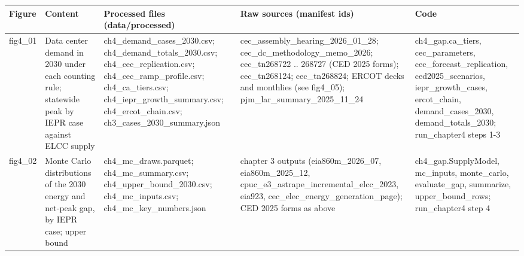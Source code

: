 \begin{tabular}{lp{4.6cm}p{5.2cm}p{4.6cm}p{4.8cm}}
\toprule
Figure & Content & Processed files (data/processed) & Raw sources (manifest ids) & Code \\
\midrule
fig4\_\allowbreak{}01 & Data center demand in 2030 under each counting rule; statewide peak by IEPR case against ELCC supply & ch4\_\allowbreak{}demand\_\allowbreak{}cases\_\allowbreak{}2030.csv; ch4\_\allowbreak{}demand\_\allowbreak{}totals\_\allowbreak{}2030.csv; ch4\_\allowbreak{}cec\_\allowbreak{}replication.csv; ch4\_\allowbreak{}cec\_\allowbreak{}ramp\_\allowbreak{}profile.csv; ch4\_\allowbreak{}ca\_\allowbreak{}tiers.csv; ch4\_\allowbreak{}iepr\_\allowbreak{}growth\_\allowbreak{}summary.csv; ch4\_\allowbreak{}ercot\_\allowbreak{}chain.csv; ch3\_\allowbreak{}cases\_\allowbreak{}2030\_\allowbreak{}summary.json & cec\_\allowbreak{}assembly\_\allowbreak{}hearing\_\allowbreak{}2026\_\allowbreak{}01\_\allowbreak{}28; cec\_\allowbreak{}dc\_\allowbreak{}methodology\_\allowbreak{}memo\_\allowbreak{}2026; cec\_\allowbreak{}tn268722 .. 268727 (CED 2025 forms); cec\_\allowbreak{}tn268124; cec\_\allowbreak{}tn268824; ERCOT decks and monthlies (see fig4\_\allowbreak{}05); pjm\_\allowbreak{}lar\_\allowbreak{}summary\_\allowbreak{}2025\_\allowbreak{}11\_\allowbreak{}24 & ch4\_\allowbreak{}gap.ca\_\allowbreak{}tiers, cec\_\allowbreak{}parameters, cec\_\allowbreak{}forecast\_\allowbreak{}replication, ced2025\_\allowbreak{}scenarios, iepr\_\allowbreak{}growth\_\allowbreak{}cases, ercot\_\allowbreak{}chain, demand\_\allowbreak{}cases\_\allowbreak{}2030, demand\_\allowbreak{}totals\_\allowbreak{}2030; run\_\allowbreak{}chapter4 steps 1-3 \\
fig4\_\allowbreak{}02 & Monte Carlo distributions of the 2030 energy and net-peak gap, by IEPR case; upper bound & ch4\_\allowbreak{}mc\_\allowbreak{}draws.parquet; ch4\_\allowbreak{}mc\_\allowbreak{}summary.csv; ch4\_\allowbreak{}upper\_\allowbreak{}bound\_\allowbreak{}2030.csv; ch4\_\allowbreak{}mc\_\allowbreak{}inputs.csv; ch4\_\allowbreak{}mc\_\allowbreak{}key\_\allowbreak{}numbers.json & chapter 3 outputs (eia860m\_\allowbreak{}2026\_\allowbreak{}07, eia860m\_\allowbreak{}2025\_\allowbreak{}12, cpuc\_\allowbreak{}e3\_\allowbreak{}astrape\_\allowbreak{}incremental\_\allowbreak{}elcc\_\allowbreak{}2023, eia923, cec\_\allowbreak{}elec\_\allowbreak{}energy\_\allowbreak{}generation\_\allowbreak{}page); CED 2025 forms as above & ch4\_\allowbreak{}gap.SupplyModel, mc\_\allowbreak{}inputs, monte\_\allowbreak{}carlo, evaluate\_\allowbreak{}gap, summarize, upper\_\allowbreak{}bound\_\allowbreak{}rows; run\_\allowbreak{}chapter4 step 4 \\

\end{tabular}
